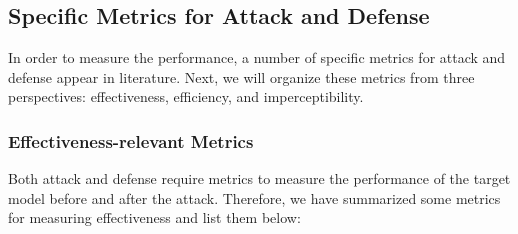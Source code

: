 \subsection{Specific Metrics for Attack and Defense}
In order to measure the performance, a number of specific metrics for attack and defense appear in literature. Next, we will organize these metrics from three perspectives: effectiveness, efficiency, and imperceptibility.

\subsubsection{Effectiveness-relevant Metrics}
Both attack and defense require metrics to measure the performance of the target model before and after the attack. Therefore, we have summarized some metrics for measuring effectiveness and list them below:

